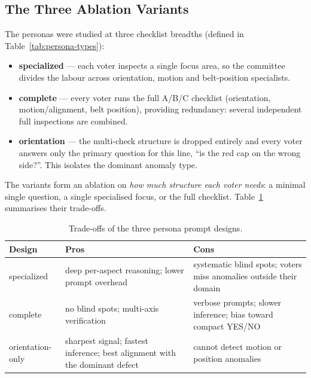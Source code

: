 \subsection{The Three Ablation Variants}
The personas were studied at three checklist breadths (defined in
Table~\ref{tab:persona-types}):
\begin{itemize}
  \item \textbf{specialized} --- each voter inspects a single focus area, so the committee
        divides the labour across orientation, motion and belt-position specialists.
  \item \textbf{complete} --- every voter runs the full A/B/C checklist (orientation,
        motion/alignment, belt position), providing redundancy: several independent full
        inspections are combined.
  \item \textbf{orientation} --- the multi-check structure is dropped entirely and every
        voter answers only the primary question for this line, ``is the red cap on the
        wrong side?''. This isolates the dominant anomaly type.
\end{itemize}
The variants form an ablation on \emph{how much structure each voter needs}: a minimal
single question, a single specialised focus, or the full checklist.
Table~\ref{tab:persona-proscons} summarises their trade-offs.

\begin{table}[!htbp]
\centering
\footnotesize
\caption{\label{tab:persona-proscons}Trade-offs of the three persona prompt designs.}
\begin{tabular}{l|p{3.5cm}|p{4.6cm}}
\hline
Design & Pros & Cons \\
\hline
specialized      & deep per-aspect reasoning; lower prompt overhead
                 & systematic blind spots; voters miss anomalies outside their domain \\
complete         & no blind spots; multi-axis verification
                 & verbose prompts; slower inference; bias toward compact YES/NO \\
orientation-only & sharpest signal; fastest inference; best alignment with the dominant
                   defect
                 & cannot detect motion or position anomalies \\
\hline
\end{tabular}
\end{table}

